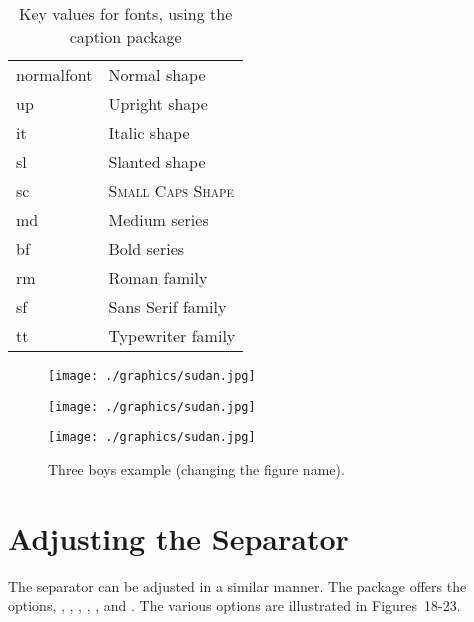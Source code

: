 \begin{table}[htp]
\centering
\smaller
\caption{Key values for fonts, using the caption package}
\begin{tabular}{ll}
\toprule
normalfont &Normal shape\\
up &Upright shape\\
it &Italic shape \\
sl &Slanted shape\\
sc & \textsc{Small Caps Shape}\\
md &Medium series\\
bf &Bold series\\
rm &Roman family\\
sf &Sans Serif family\\
tt &Typewriter family\\
\bottomrule
\end{tabular}
\end{table}

\begin{teXXX}
\captionsetup{name=Figure.}
\end{teXXX}

\begin{figure*}[h]
\captionsetup{skip=3pt}
\captionsetup{font=small}
\captionsetup{name=Fig}
\captionsetup{labelfont=bf,textfont=it}
\RaggedRight
\centering 
\begin{minipage}[t]{90pt}
 \texttt{[image: ./graphics/sudan.jpg]}
 \caption{\acaption }
\end{minipage}
\captionsetup{name=Figure}
\begin{minipage}[t]{90pt}
 \texttt{[image: ./graphics/sudan.jpg]}
 \caption{\acaption }
\end{minipage}
\captionsetup{name=Fig,labelsep=space}
\begin{minipage}[t]{90pt}
 \texttt{[image: ./graphics/sudan.jpg]}
 \caption{\acaption }
\end{minipage}
 \caption{Three boys example (changing the figure name).}
\end{figure*}

\section{Adjusting the Separator}


The separator can be adjusted in a similar manner. The package offers the options, , , , , ,  and .  The various options are illustrated
in \hbox{Figures~18-23}.




